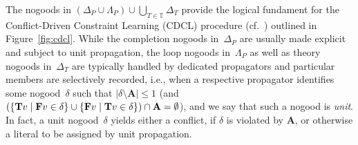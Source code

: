 \documentclass[a4paper,USenglish]{oasics-v2016}
\newcommand{\Tsign}{\ensuremath{\mathbf{T}}}
\newcommand{\Fsign}{\ensuremath{\mathbf{F}}}
\newcommand{\Tlit}[1]{\ensuremath{\Tsign #1}}
\newcommand{\Flit}[1]{\ensuremath{\Fsign #1}}
\newcommand{\Ass}{\ensuremath{\mathbf{A}}}
\begin{document}
The nogoods in $(\Delta_P\cup\Lambda_P)\cup\bigcup_{T\in\mathbb{T}}\Delta_T$ provide the
logical fundament for the Conflict-Driven Constraint Learning (CDCL) procedure
(cf.\ \cite{malyma09a,gekasc09c})
outlined in Figure~\ref{fig:cdcl}.
While the completion nogoods in~$\Delta_P$ are usually made explicit and subject to
unit propagation,
the loop nogoods in~$\Lambda_P$ as well as theory nogoods in~$\Delta_T$ are typically
handled by dedicated propagators and particular members are selectively recorded, i.e.,
when a respective propagator identifies some nogood~$\delta$ such that
$|\delta\setminus\Ass|\leq 1$
(and $(\{\Tlit{v}\mid\Flit{v}\in\nolinebreak\delta\}\cup\linebreak[1]\{\Flit{v}\mid\Tlit{v}\in\delta\})\cap\Ass=\emptyset$), and we say that such a nogood is \emph{unit}.
In fact, a unit nogood~$\delta$ yields either a conflict, if $\delta$ is violated by $\Ass$,
or otherwise a literal to be assigned by unit propagation.
\end{document}
